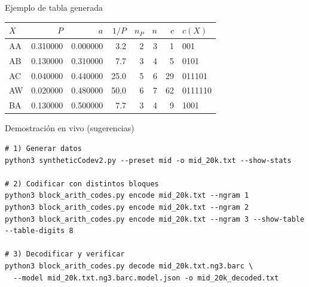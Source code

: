 \documentclass{beamer}
\theoremstyle{plain}
\theoremstyle{example}
\theoremstyle{example}
\begin{document}
\begin{frame}{Ejemplo de tabla  generada}
\small
\begin{tabular}{lrrrrrrl}
\toprule
\(X\) & \(P\) & \(a\) & \(1/P\) & \(n_P\) & \(n\) & \(c\) & \(c(X)\) \\
\midrule
AA & 0.310000 & 0.000000 & 3.2 & 2 & 3 & 1  & 001 \\
AB & 0.130000 & 0.310000 & 7.7 & 3 & 4 & 5  & 0101 \\
AC & 0.040000 & 0.440000 & 25.0 & 5 & 6 & 29 & 011101 \\
AW & 0.020000 & 0.480000 & 50.0 & 6 & 7 & 62 & 0111110 \\
BA & 0.130000 & 0.500000 & 7.7 & 3 & 4 & 9  & 1001 \\
\bottomrule
\end{tabular}


\end{frame}

\begin{frame}[fragile]{Demostración en vivo (sugerencias)}
\begin{lstlisting}
# 1) Generar datos
python3 syntheticCodev2.py --preset mid -o mid_20k.txt --show-stats

# 2) Codificar con distintos bloques
python3 block_arith_codes.py encode mid_20k.txt --ngram 1
python3 block_arith_codes.py encode mid_20k.txt --ngram 2
python3 block_arith_codes.py encode mid_20k.txt --ngram 3 --show-table --table-digits 8

# 3) Decodificar y verificar
python3 block_arith_codes.py decode mid_20k.txt.ng3.barc \
  --model mid_20k.txt.ng3.barc.model.json -o mid_20k_decoded.txt
\end{lstlisting}
\end{frame}
\end{document}
